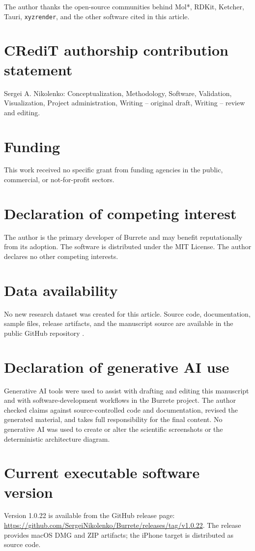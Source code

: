 \documentclass[preprint,12pt,a4paper]{elsarticle}
\begin{document}
The author thanks the open-source communities behind Mol*, RDKit, Ketcher,
Tauri, \texttt{xyzrender}, and the other software cited in this article.

\section*{CRediT authorship contribution statement}

Sergei A. Nikolenko: Conceptualization, Methodology, Software, Validation,
Visualization, Project administration, Writing -- original draft, Writing --
review and editing.

\section*{Funding}

This work received no specific grant from funding agencies in the public,
commercial, or not-for-profit sectors.

\section*{Declaration of competing interest}

The author is the primary developer of Burrete and may benefit reputationally
from its adoption. The software is distributed under the MIT License. The
author declares no other competing interests.

\section*{Data availability}

No new research dataset was created for this article. Source code,
documentation, sample files, release artifacts, and the manuscript source are
available in the public GitHub repository \cite{burrete}.

\section*{Declaration of generative AI use}

Generative AI tools were used to assist with drafting and editing this
manuscript and with software-development workflows in the Burrete project. The
author checked claims against source-controlled code and documentation, revised
the generated material, and takes full responsibility for the final content.
No generative AI was used to create or alter the scientific screenshots or the
deterministic architecture diagram.




\section*{Current executable software version}

Version 1.0.22 is available from the GitHub release page:
\url{https://github.com/SergeiNikolenko/Burrete/releases/tag/v1.0.22}.
The release provides macOS DMG and ZIP artifacts; the iPhone target
is distributed as source code.
\end{document}
